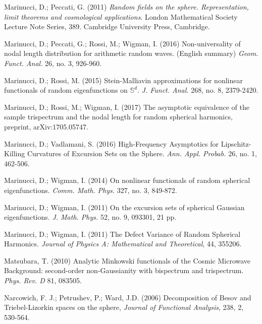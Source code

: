 \begin{thebibliography}{99}
	  Marinucci, D.; Peccati, G. (2011) \textit{Random fields on the sphere. Representation, limit theorems and cosmological applications}. London Mathematical Society Lecture Note Series, 389. Cambridge University Press, Cambridge. 
	
	
	 Marinucci, D.; Peccati, G.; Rossi, M.; Wigman, I. (2016)
	Non-universality of nodal length distribution for arithmetic random waves. (English summary)
	\textit{Geom. Funct. Anal.} 26, no. 3, 926-960.
	
	 Marinucci, D.; Rossi, M. (2015) Stein-Malliavin approximations for nonlinear functionals of random eigenfunctions on $\mathbb{S}^d$. \textit{J. Funct. Anal. }268, no. 8, 2379-2420. 
	
	
	
	 Marinucci, D.; Rossi, M.; Wigman, I. (2017) The asymptotic
	equivalence of the sample trispectrum and the nodal length for random
	spherical harmonics, preprint, arXiv:1705.05747.
	
	
	
	
	 Marinucci, D.; Vadlamani, S. (2016) High-Frequency Asymptotics for Lipschitz-Killing Curvatures of Excursion Sets on the Sphere. \textit{Ann. Appl. Probab.} 26, no. 1, 462-506. 
	
	
	
	 Marinucci, D.; Wigman, I. (2014) On nonlinear functionals of
	random spherical eigenfunctions. \textit{Comm. Math. Phys.} 327, no. 3,
	849-872.
	
	 Marinucci, D.; Wigman, I. (2011) On the excursion sets of spherical Gaussian eigenfunctions. \textit{J. Math. Phys.} 52, no. 9, 093301, 21 pp.
	
	 Marinucci, D.; Wigman, I. (2011) The Defect Variance of Random Spherical Harmonics. \textit{Journal of Physics A: Mathematical and Theoretical}, 44, 355206.
	
	 Matsubara, T. (2010) Analytic Minkowski functionals of the Cosmic Microwave Background: second-order non-Gaussianity with bispectrum and trispectrum. \textit{Phys. Rev. D} 81, 083505.
	
	 Narcowich, F. J.; Petrushev, P.; Ward, J.D. (2006) Decomposition of Besov and Triebel-Lizorkin spaces on the sphere, \textit{Journal of Functional Analysis}, 238, 2, 530-564.
	

\end{thebibliography}

